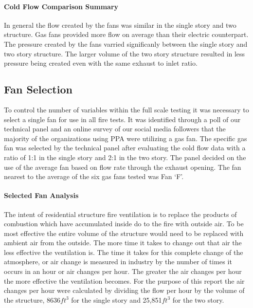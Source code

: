 \documentclass{article}
\begin{document}
\paragraph{Cold Flow Comparison Summary} \mbox{}

In general the flow created by the fans was similar in the single story and two structure. Gas fans provided more flow on average than their electric counterpart. The pressure created by the fans varried significanly between the single story and two story structure. The larger volume of the two story structure resulted in less pressure being created even with the same exhaust to inlet ratio. 

\subsection{Fan Selection}

To control the number of variables within the full scale testing it was necessary to select a single fan for use in all fire tests. It was identified through a poll of our technical panel and an online survey of our social media followers that the majority of the organizations using PPA were utilizing a gas fan. The specific gas fan was selected by the technical panel after evaluating the cold flow data with a ratio of 1:1 in the single story and 2:1 in the two story. The panel decided on the use of the average fan based on flow rate through the exhaust opening. The fan nearest to the average of the six gas fans tested was Fan `F'. 

\paragraph{Selected Fan Analysis} \mbox{}

The intent of residential structure fire ventilation is to replace the products of combustion which have accumulated inside do to the fire with outside air. To be most effective the entire volume of the structure would need to be replaced with ambient air from the outside. The more time it takes to change out that air the less effective the ventilation is. The time it takes for this complete change of the atmosphere, or air change is measured in industry by the number of times it occurs in an hour or air changes per hour. The greater the air changes per hour the more effective the ventilation becomes. For the purpose of this report the air changes per hour were calculated by dividing the flow per hour by the volume of the structure,  8636$ft^3$ for the single story and 25,851$ft^3$ for the two story. 
\end{document}
